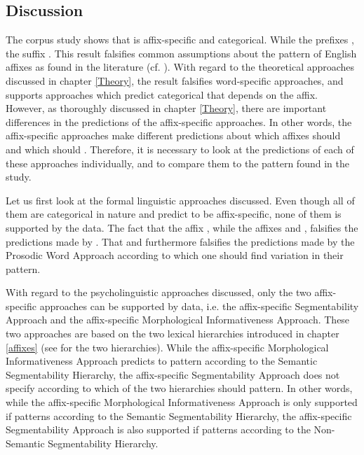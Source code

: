 \subsection{Discussion}


The corpus study shows that  is affix-specific and categorical. While the prefixes , the suffix  . 
This result falsifies common assumptions about the  pattern of English affixes as found in the literature (cf. ). 
With regard to the theoretical approaches discussed in chapter \ref{Theory}, the result falsifies word-specific approaches, and supports approaches which predict categorical  that depends on the affix. However, as thoroughly discussed in chapter \ref{Theory}, there are important differences in the predictions of the affix-specific approaches. In other words, the affix-specific approaches make different predictions about which affixes should  and which should . Therefore, it is necessary to look at the predictions of each of these approaches individually, and to compare them to the  pattern found in the study.

Let us first look at the formal linguistic approaches discussed. Even though all of them are categorical in nature and predict  to be affix-specific, none of them is supported by the data. The fact that the  affix  , while the  affixes  and  , falsifies the predictions made by . That  and   furthermore falsifies the predictions made by the Prosodic Word Approach according to which one should find variation in their  pattern. 

With regard to the psycholinguistic approaches discussed, only the two affix-specific approaches can be supported by data, i.e. the affix-specific Segmentability Approach and the affix-specific Morphological Informativeness Approach. 
These two approaches are based on the two lexical  hierarchies introduced in chapter \ref{affixes} (see  for the two hierarchies). While the affix-specific Morphological Informativeness Approach predicts  to pattern according to the Semantic Segmentability Hierarchy, the affix-specific Segmentability Approach does not specify according to which of the two  hierarchies  should pattern. In other words, while the affix-specific Morphological Informativeness Approach is only supported if  patterns according to the Semantic Segmentability Hierarchy, the affix-specific Segmentability Approach is also supported if  patterns according to the Non-Semantic Segmentability Hierarchy. 



